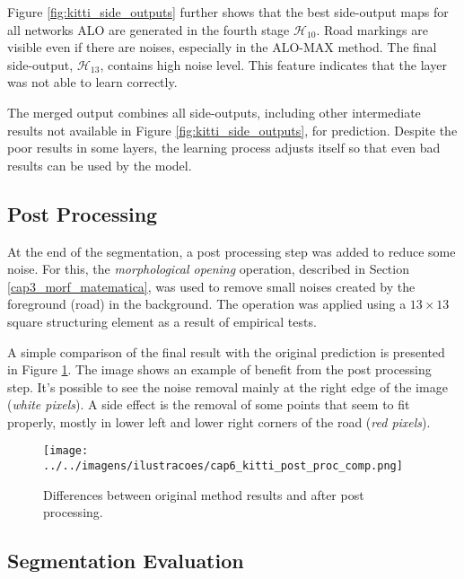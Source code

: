 Figure \ref{fig:kitti_side_outputs} further shows that the best side-output maps for all networks ALO are generated in the fourth stage $\mathcal{H}_{10}$. 
Road markings are visible even if there are noises, especially in the ALO-MAX method.
The final side-output, $\mathcal{H}_{13}$, contains high noise level.
This feature indicates that the layer was not able to learn correctly.

The merged output combines all side-outputs, including other intermediate results not available in Figure \ref{fig:kitti_side_outputs}, for prediction.
Despite the poor results in some layers, the learning process adjusts itself so that even bad results can be used by the model.

\subsection{Post Processing}
\label{cap6_pos_processamento}

At the end of the segmentation, a post processing step was added to reduce some noise.
For this, the \textit{morphological opening} operation, described in Section \ref{cap3_morf_matematica}, was used to remove small noises created by the foreground (road) in the background.
The operation was applied using a $13 \times 13$ square structuring element as a result of empirical tests.

A simple comparison of the final result with the original prediction is presented in Figure \ref{fig:kitti_post_processing_comp}.
The image shows an example of benefit from the post processing step.
It's possible to see the noise removal mainly at the right edge of the image (\textit{white pixels}).
A side effect is the removal of some points that seem to fit properly, mostly in lower left and lower right corners of the road (\textit{red pixels}).

\begin{figure}%
  \centering
  \caption{Differences between original method results and after post processing.}
  \texttt{[image: ../../imagens/ilustracoes/cap6\_kitti\_post\_proc\_comp.png]}
  \sourceOwn
  \label{fig:kitti_post_processing_comp}
\end{figure}

\subsection{Segmentation Evaluation}
\label{cap6_resultados_segmentacao}

